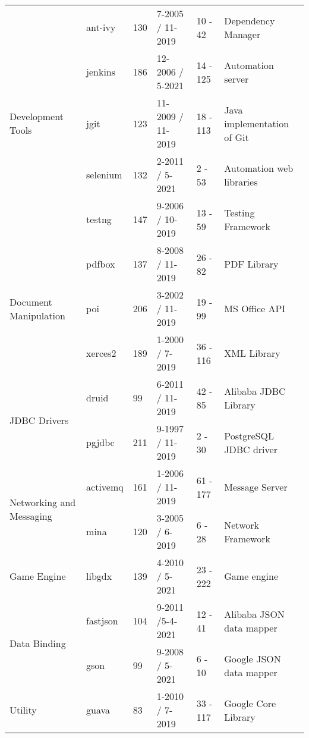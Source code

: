 \begin{table}[]
\begin{tabular}{m{1.75cm}|l|l|l|l|l}
      \multirow{5}{1.75cm}{Development Tools} & ant-ivy & 130 & 7-2005 / 11-2019 & 10 - 42 & Dependency Manager \\
       & jenkins & 186 & 12-2006 / 5-2021 & 14 - 125 & Automation server \\
       & jgit & 123 & 11-2009 / 11-2019 & 18 - 113 & Java implementation of Git\\
       & selenium & 132 & 2-2011 / 5-2021 & 2 - 53 & Automation web libraries\\
       & testng & 147 & 9-2006 / 10-2019 & 13 - 59 & Testing Framework \\\midrule

      \multirow{3}{1.75cm}{Document Manipulation} & pdfbox & 137 & 8-2008 / 11-2019 & 26 - 82 & PDF Library \\
       & poi & 206 & 3-2002 / 11-2019 & 19 - 99 & MS Office API \\
       & xerces2 & 189 & 1-2000 / 7-2019 & 36 - 116 & XML Library \\\midrule

      \multirow{2}{1.75cm}{JDBC Drivers} & druid & 99 & 6-2011 / 11-2019 & 42 - 85 & Alibaba JDBC Library \\
       & pgjdbc & 211 & 9-1997 / 11-2019 & 2 - 30 & PostgreSQL JDBC driver \\\midrule

      \multirow{2}{1.75cm}{Networking and Messaging} & activemq & 161 & 1-2006 / 11-2019 & 61 - 177 & Message Server \\
       & mina & 120 & 3-2005 / 6-2019 & 6 - 28 & Network Framework \\ \midrule

      Game Engine & libgdx & 139 & 4-2010 / 5-2021 & 23 - 222 & Game engine\\ \midrule

      \multirow{2}{1.75cm}{Data Binding} & fastjson & 104 & 9-2011 /5-4-2021 & 12 - 41 & Alibaba JSON data mapper \\
       & gson & 99 & 9-2008 / 5-2021 & 6 - 10 & Google JSON data mapper\\ \midrule

      Utility & guava & 83 & 1-2010 / 7-2019 & 33 - 117 & Google Core Library \\
      
      \bottomrule
      \end{tabular}%
\end{table}%

